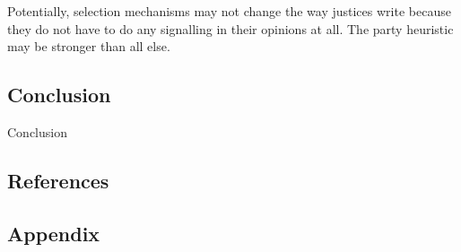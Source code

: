 Potentially, selection mechanisms may not change the way justices write
because they do not have to do any signalling in their opinions at all.
The party heuristic may be stronger than all else.

\subsection{Conclusion}\label{conclusion}

Conclusion

\newpage

\subsection{References}\label{references}

\newpage

\subsection{Appendix}\label{appendix}

